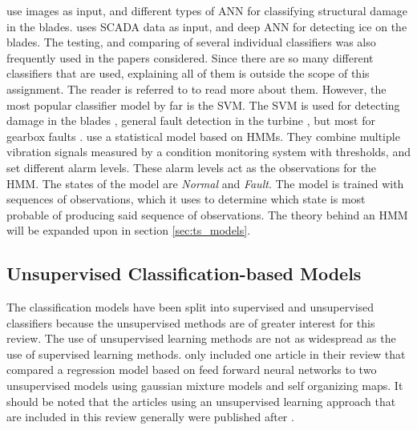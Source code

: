 \textcite{image_based_surface_damage_detection_DL_drone_inspection, image_based_YOLO_YSODA, AI_image_analytics_2_classify_blade_defects, blade_defect_detection_imaging_array} use images as input, and different types of ANN for classifying structural damage in the blades. 
\textcite{deep_learning_for_imbalanced_class_detection_bearing_cm} uses SCADA data as input, and deep ANN for detecting ice on the blades. 
The testing, and comparing of several individual classifiers was also frequently used in the papers considered. 
Since there are so many different classifiers that are used, explaining all of them is outside the scope of this assignment. 
The reader is referred to \cite{ml_cm_wt_blade_ARMA_2018, lin_and_non_lin_feat_for_ice_detection_on_blades, image_texture_analysis_FD_wt, ice_detection_using_ITL, vibration_ARMA_decision_tree_cm_wt} to read more about them.
However, the most popular classifier model by far is the SVM. 
The SVM is used for detecting damage in the blades \cite{blade_damage_detection_sup_ml_alg}, general fault detection in the turbine \cite{fault_classification_using_CSO_SVM}, but most for gearbox faults \cite{VMD_MPE_COVAL_fault_detection_gearbox,vibration_acustic_decision_tree_SVM_gearbox, integrated_cm_bearing_fault_wt_gearbox, roller_bearings_cm_fisher_score_and_permutation_entropy}. 
\textcite{fault_monitoring_HMM} use a statistical model based on HMMs. 
They combine multiple vibration signals measured by a condition monitoring system with thresholds, and set different alarm levels. 
These alarm levels act as the observations for the HMM. 
The states of the model are \textit{Normal} and \textit{Fault}. 
The model is trained with sequences of observations, which it uses to determine which state is most probable of producing said sequence of observations. \bigskip 
The theory behind an HMM will be expanded upon in section \ref{sec:ts_models}.

\subsection{Unsupervised Classification-based Models}
The classification models have been split into supervised and unsupervised classifiers because the unsupervised methods are of greater interest for this review. 
The use of unsupervised learning methods are not as widespread as the use of supervised learning methods. 
\textcite{ml_for_wt_cond_monit_rev} only included one article in their review that compared a regression model based on feed forward neural networks to two unsupervised models using gaussian mixture models and self organizing maps. 
It should be noted that the articles using an unsupervised learning approach that are included in this review generally were published after \textcite{ml_for_wt_cond_monit_rev}.

